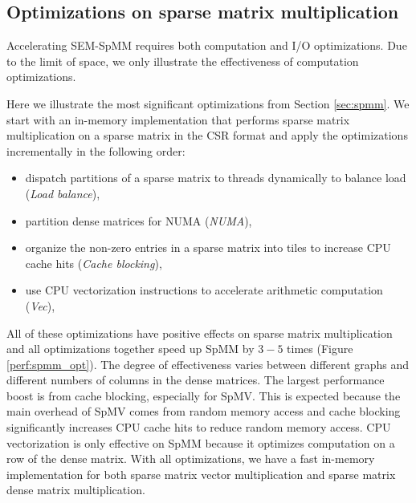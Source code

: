 \subsection{Optimizations on sparse matrix multiplication}
Accelerating SEM-SpMM requires both computation and I/O optimizations. Due to
the limit of space, we only illustrate the effectiveness of computation
optimizations.

Here we illustrate the most significant optimizations from Section
\ref{sec:spmm}. We start with an in-memory implementation that
performs sparse matrix multiplication on a sparse matrix in the CSR format
and apply the optimizations incrementally in the following order:
\begin{itemize} \itemsep1pt \parskip0pt 
	\item dispatch partitions of a sparse matrix to threads dynamically
		to balance load (\textit{Load balance}),
	\item partition dense matrices for NUMA (\textit{NUMA}),
	\item organize the non-zero entries in a sparse matrix into tiles to
		increase CPU cache hits (\textit{Cache blocking}),
	\item use CPU vectorization instructions to accelerate arithmetic
		computation (\textit{Vec}),
\end{itemize}

All of these optimizations have positive effects on sparse matrix
multiplication and all optimizations together speed up SpMM by $3-5$ times
(Figure \ref{perf:spmm_opt}). The degree of effectiveness
varies between different graphs and different numbers of columns in
the dense matrices. The largest performance boost is from cache blocking,
especially for SpMV.
This is expected because the main overhead of SpMV comes from random memory
access and cache blocking significantly increases CPU cache hits to reduce
random memory access. CPU vectorization is only effective on SpMM because
it optimizes computation on a row of the dense matrix.
With all optimizations, we have a fast in-memory implementation for both
sparse matrix vector multiplication and sparse matrix dense matrix multiplication.

